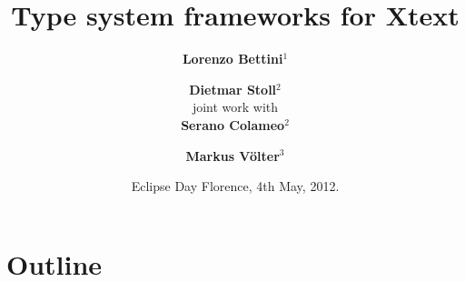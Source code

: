 \title{Type system frameworks for Xtext}
\author{\textbf{Lorenzo Bettini}$^1$ \and \textbf{Dietmar Stoll}$^2$\\
joint work with\\
\textbf{Serano Colameo}$^2$ \and \textbf{Markus V\"olter}$^3$}
\date{Eclipse Day Florence, 4th May, 2012.}


\maketitle

\section*{Outline}
\begin{frame}
   \tableofcontents
\end{frame}










